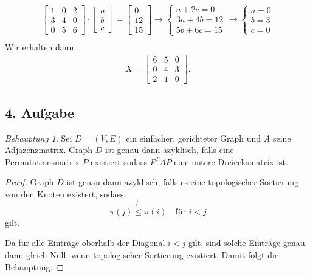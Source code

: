 \documentclass[fleqn,draft,a5paper]{article}
\theoremstyle{remark}
\newtheorem*{Behauptung}{Behauptung}
\begin{document}
\begin{multline*}
  \begin{bmatrix}
    1 & 0 & 2 \\
    3 & 4 & 0 \\
    0 & 5 & 6
  \end{bmatrix}
  \cdot
  \begin{bmatrix}
    a \\ b \\ c
  \end{bmatrix}
  =
  \begin{bmatrix}
    0 \\ 12 \\ 15
  \end{bmatrix} \to
  \begin{cases}
    a + 2c = 0 \\
    3a + 4b = 12 \\
    5b + 6c = 15
  \end{cases} \to
  \begin{cases}
    a = 0 \\ b = 3 \\ c = 0
  \end{cases}  \\
\end{multline*}
Wir erhalten dann
\begin{align*}
  X =
  \begin{bmatrix}
    6 & 5 & 0 \\ 0 & 4 & 3 \\ 2 & 1 & 0
  \end{bmatrix}.
\end{align*}

\subsection{4. Aufgabe}
\begin{Behauptung}
  Sei \(D=(V,E)\) ein einfacher, gerichteter Graph und \(A\) seine
  Adjazenzmatrix.  Graph \(D\) ist genau dann azyklisch, falls eine
  Permutationsmatrix \(P\) existiert sodass \(P^{T}AP\) eine untere
  Dreiecksmatrix ist.
\end{Behauptung}
\begin{proof}
  Graph \(D\) ist genau dann azyklisch, falls es eine topologischer
  Sortierung von den Knoten existert, sodass
  \[\pi(j) \not{\le} \pi(i) \quad \text{für } i < j\]
  gilt.

  Da für alle Einträge oberhalb der Diagonal \(i < j\) gilt, sind solche
  Einträge genau dann gleich Null, wenn topologischer Sortierung
  existiert.  Damit folgt die Behauptung.
\end{proof}
\end{document}

